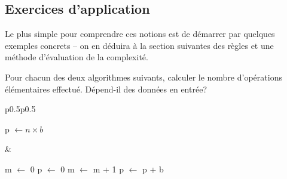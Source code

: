 \documentclass[12pt]{article}
\begin{document}
	\subsection{Exercices d'application}
	Le plus simple pour comprendre ces notions est de démarrer par quelques exemples concrets -- on en déduira à la section suivantes des règles et une méthode d'évaluation de la complexité.
	\begin{MonExo}
		Pour chacun des deux algorithmes suivants, calculer le nombre d'opérations élémentaires effectué. Dépend-il des données en entrée?
		
		\begin{tabular}{p{0.5\textwidth}p{0.5\textwidth}}
			\begin{minipage}{\linewidth}
				\begin{algorithmic}[1]
					\State p $\leftarrow n \times b$
					\State{}
					\EndFunction
				\end{algorithmic}
			\end{minipage}
			&
			\begin{minipage}{\linewidth}
				\begin{algorithmic}[1]
					\State m $\leftarrow$ 0
					\State p $\leftarrow$ 0
					\State m $\leftarrow$ m + 1
					\State p $\leftarrow$ p + b
					\EndWhile
					\State{}
					\EndFunction
				\end{algorithmic}
			\end{minipage}
			\\
		\end{tabular}
	\end{MonExo}
		
\end{document}
